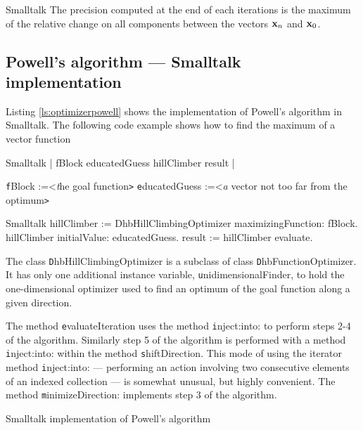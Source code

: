 \begin{displaycode}{Smalltalk}
The precision computed  at the end of each iterations is the
maximum of the relative change on all components between the
vectors ${\textbf x}_n$ and ${\textbf x}_0$.

\subsection{Powell's algorithm --- Smalltalk implementation}
 Listing \ref{ls:optimizerpowell}
shows the implementation of Powell's algorithm in Smalltalk. The
following code example shows how to find the maximum of a vector
function

\begin{listing}[label=ex:spowell]{Smalltalk}
{}
 | fBlock educatedGuess hillClimber result |
\end{listing}
 {\texttt fBlock :=<\textsl the goal function\texttt >}\hfil\break
 {\texttt educatedGuess :=<\textsl a vector not too far from the optimum\texttt >}
\begin{displaycode}{Smalltalk}
 hillClimber := DhbHillClimbingOptimizer maximizingFunction: fBlock.
 hillClimber initialValue: educatedGuess.
 result := hillClimber evaluate.
\end{displaycode}
The class {\texttt DhbHillClimbingOptimizer} is a subclass of class
{\texttt DhbFunctionOptimizer}. It has only one additional instance
variable, {\texttt unidimensionalFinder}, to hold the one-dimensional
optimizer used to find an optimum of the goal function along a
given direction.

The method {\texttt evaluateIteration} uses the method {\texttt
inject:into:} to perform steps 2-4 of the algorithm. Similarly
step 5 of the algorithm is performed with a method {\texttt
inject:into:} within the method {\texttt shiftDirection}. This mode of
using the iterator method {\texttt inject:into:} --- performing an
action involving two consecutive elements of an indexed collection
--- is somewhat unusual, but highly convenient\cite{Beck}. The method {\texttt
minimizeDirection:} implements step 3 of the algorithm.

\begin{listing} Smalltalk implementation of Powell's algorithm
\label{ls:optimizerpowell}

\end{listing}


\end{displaycode}
